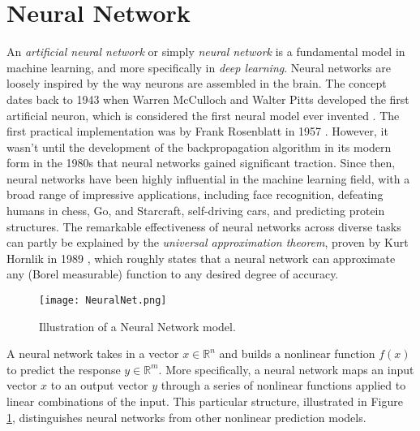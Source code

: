 \documentclass[../../thesis.tex]{subfiles}
\begin{document}






\section{Neural Network}
An \textit{artificial neural network} or simply \textit{neural network} is a fundamental model in machine learning, and more specifically in \textit{deep learning}. Neural networks are loosely inspired by the way neurons are assembled in the brain. The concept dates back to 1943 when Warren McCulloch and Walter Pitts developed the first artificial neuron, which is considered the first neural model ever invented \cite{MCCULLOCH199099}. The first practical implementation was by Frank Rosenblatt in 1957 \cite{rosenblatt1957perceptron}. However, it wasn't until the development of the backpropagation algorithm in its modern form in the 1980s that neural networks gained significant traction. Since then, neural networks have been highly influential in the machine learning field, with a broad range of impressive applications, including face recognition, defeating humans in chess, Go, and Starcraft, self-driving cars, and predicting protein structures.
The remarkable effectiveness of neural networks across diverse tasks can partly be explained by the \textit{universal approximation theorem}, proven by Kurt Hornlik in 1989 \cite{HORNIK1989359}, which roughly states that a neural network can approximate any (Borel measurable) function to any desired degree of accuracy. \newline

\begin{figure}
    \texttt{[image: NeuralNet.png]}
    \centering 
    \caption{Illustration of a Neural Network model.}
    \label{fig:NeuralNet}
\end{figure}

A neural network takes in a vector $x \in \mathbb{R}^n$ and builds a nonlinear function $f(x)$ to predict the response $y\in \mathbb{R}^m$. More specifically, a neural network maps an input vector $x$ to an output vector $y$ through a series of nonlinear functions applied to linear combinations of the input. This particular structure, illustrated in Figure \ref{fig:NeuralNet}, distinguishes neural networks from other nonlinear prediction models. \newline
\end{document}
